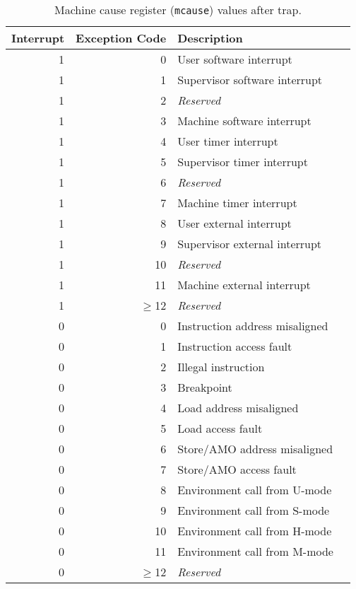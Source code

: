 \begin{table*}[h!]
\begin{center}
\begin{tabular}{|r|r|l|l|}

  \hline
  Interrupt & Exception Code  & Description \\
  \hline	 
  1         & 0               & User software interrupt \\
  1         & 1               & Supervisor software interrupt \\
  1         & 2               & {\em Reserved} \\ \hline
  1         & 3               & Machine software interrupt \\
  1         & 4               & User timer interrupt \\
  1         & 5               & Supervisor timer interrupt \\
  1         & 6               & {\em Reserved} \\ \hline
  1         & 7               & Machine timer interrupt \\
  1         & 8               & User external interrupt \\
  1         & 9               & Supervisor external interrupt \\
  1         & 10              & {\em Reserved} \\ \hline
  1         & 11              & Machine external interrupt \\
  1         & $\ge$12         & {\em Reserved} \\ \hline
  0         & 0               & Instruction address misaligned \\
  0         & 1               & Instruction access fault \\
  0         & 2               & Illegal instruction \\   
  0         & 3               & Breakpoint \\
  0         & 4               & Load address misaligned \\
  0         & 5               & Load access fault \\
  0         & 6               & Store/AMO address misaligned \\
  0         & 7               & Store/AMO access fault \\
  0         & 8               & Environment call from U-mode\\
  0         & 9               & Environment call from S-mode \\
  0         & 10              & Environment call from H-mode \\
  0         & 11              & Environment call from M-mode \\
  0         & $\ge$12         & {\em Reserved} \\
  \hline

\end{tabular}
\end{center}
\caption{Machine cause register ({\tt mcause}) values after trap.}
\label{mcauses}
\end{table*}

